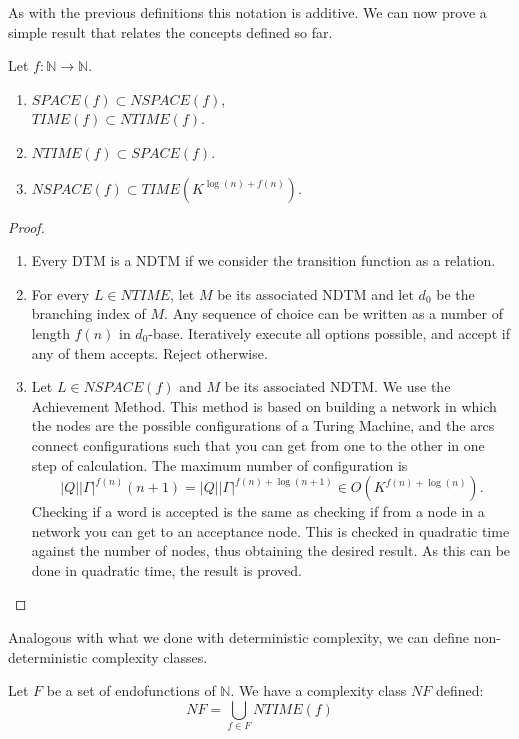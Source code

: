 As with the previous definitions this notation is additive. We can now prove a simple result that relates the concepts defined so far.

\begin{theorem}
  Let $f: \mathbb{N}\to  \mathbb{N}$.
  \begin{enumerate}
  \item $SPACE(f) \subset NSPACE(f)$,\\
    $TIME(f) \subset NTIME(f)$.
  \item $NTIME(f) \subset SPACE(f)$.
  \item $NSPACE(f) \subset TIME(K^{ \log(n)+ f(n)} )$.
  \end{enumerate}
\end{theorem}
\begin{proof}\hfill
  \begin{enumerate}
  \item Every DTM is a NDTM if we consider the transition function as a relation.
  
  \item For every $L\in NTIME$, let $M$ be its associated NDTM and let $d_0$ be the branching index of $M$. Any sequence of choice can be written as a number of length $f(n)$ in $d_0$-base. Iteratively execute all options possible, and accept if any of them accepts. Reject otherwise. 

    
  \item Let $L \in NSPACE(f)$ and $M$ be its associated NDTM. We use the Achievement Method. This method is based on building a network in which the nodes are the possible configurations of a Turing Machine, and the arcs connect configurations such that you can get from one to the other in one step of calculation. The maximum number of configuration is
    $$|Q||\Gamma|^{f(n)} (n + 1) = |Q||\Gamma|^{f(n)+\log(n + 1)} \in O (K^{f(n)+\log(n)}).$$
Checking if a word is accepted is the same as checking if from a node in a network you can get to an acceptance node. This is checked in quadratic time against the number of nodes, thus obtaining the desired result. As this can be done in quadratic time, the result is proved.
  \end{enumerate}
\end{proof}

Analogous with what we done with deterministic complexity, we can define non-deterministic complexity classes.

\begin{definition}
  Let $F$ be a set of endofunctions of $\mathbb{N}$. We have a complexity class $NF$ defined:
  $$NF =  \bigcup_{f \in F} NTIME(f) $$
\end{definition}

